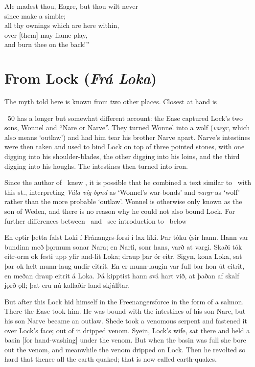 \bvb Ale madest thou, Eagre, but thou wilt never \\
since make a simble; \\
all thy ownings which are here within, \\
over [them] may flame play, \\
and burn thee on the back!”\evb
\evg

\sectionline

\section{From Lock (\emph{Frá Loka})}

The myth told here is known from two other places. Closest at hand is \Voluspa\

\Gylfaginning\ 50 has a longer but somewhat different account: the Ease captured Lock’s two sons, Wonnel and “Nare or Narve”. They turned Wonnel into a wolf (\emph{vargr}, which also means ‘outlaw’) and had him tear his brother Narve apart. Narve’s intestines were then taken and used to bind Lock on top of three pointed stones, with one digging into his shoulder-blades, the other digging into his loins, and the third digging into his houghs. The intestines then turned into iron.

Since the author of \Gylfaginning\ knew \Voluspa, it is possible that he combined a text similar to \FraLoka\ with this st., interpreting \emph{Vála víg-bǫnd} as ‘Wonnel’s war-bonds’ and \emph{vargr} as ‘wolf’ rather than the more probable ‘outlaw’. Wonnel is otherwise only known as the son of Weden, and there is no reason why he could not also bound Lock. For further differences between \Gylfaginning\ and \FraLoka\ see introduction to \FraLoka\ below

\sectionline

\bpg\bpa En eptir þetta falst Loki í Fránangrs-forsi í lax líki. Þar tóku ę́sir hann. Hann var bundinn með þǫrmum sonar Nara; en Narfi, sonr hans, varð at vargi. Skaði tók eitr-orm ok festi upp yfir and-lit Loka; draup þar ór eitr. Sigyn, kona Loka, sat þar ok helt munn-laug undir eitrit. En er munn-laugin var full bar hon út eitrit, en meðan draup eitrit á Loka. Þá kipptist hann svá hart við, at þaðan af skalf jǫrð ǫll; þat eru nú kallaðir land-skjálftar.\epa

\bpb But after this Lock hid himself in the Freenangersforce in the form of a salmon. There the Ease took him. He was bound with the intestines of his son Nare, but his son Narve became an outlaw. Shede took a venomous serpent and fastened it over Lock’s face; out of it dripped venom. Syein, Lock’s wife, sat there and held a basin [for hand-washing] under the venom. But when the basin was full she bore out the venom, and meanwhile the venom dripped on Lock. Then he revolted so hard that thence all the earth quaked; that is now called earth-quakes.\epb\epg
